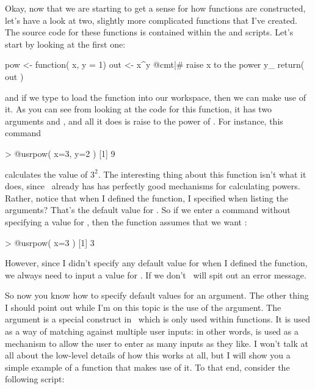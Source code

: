 
Okay, now that we are starting to get a sense for how functions are constructed, let's have a look at two, slightly more complicated functions that I've created. The source code for these functions is contained within the  and  scripts. Let's start by looking at the first one:

\begin{script}
pow <- function( x, y = 1) {
  out <- x^y  @cmt|# raise x to the power y_
  return( out )
}
\end{script}
and if we type  to load the  function into our workspace, then we can make use of it. As you can see from looking at the code for this function, it has two arguments  and , and all it does is raise  to the power of . For instance, this command
\begin{rblock1}
> @usr{pow( x=3, y=2 )}
[1] 9
\end{rblock1}
calculates the value of $3^2$. The interesting thing about this function isn't what it does, since \R\ already has has perfectly good mechanisms for calculating powers. Rather, notice that when I defined the function, I specified  when listing the arguments? That's the default value for . So if we enter a command without specifying a value for , then the function assumes that we want :
\begin{rblock1}
> @usr{pow( x=3 )}
[1] 3
\end{rblock1}
However, since I didn't specify any default value for  when I defined the  function, we always need to input a value for . If we don't \R\ will spit out an error message.

So now you know how to specify default values for an argument. The other thing I should point out while I'm on this topic is the use of the  argument. The  argument is a special construct in \R\ which is only used within functions. It is used as a way of matching against multiple user inputs: in other words,  is used as a mechanism to allow the user to enter as many inputs as they like. I won't talk at all about the low-level details of how this works at all, but I will show you a simple example of a function that makes use of it. To that end, consider the following script:

